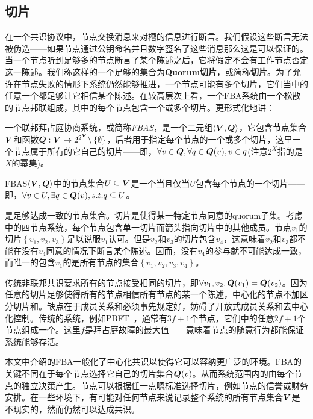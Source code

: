 \subsection{{\quorum}切片}

在一个共识协议中，节点交换消息来对槽的信息进行断言。我们假设这些断言无法被伪造——如果节点通过公钥命名并且数字签名了这些消息那么这是可以保证的。当一个节点听到足够多的节点断言了某个陈述之后，它将假定不会有工作节点否定这一陈述。我们称这样的一个足够的集合为\textbf{Quorum切片}，或简称\textbf{切片}。为了允许在节点失败的情形下系统仍然能够推进，一个节点可能有多个切片，它们当中的任意一个都足够让它相信某个陈述。在较高层次上看，一个FBA系统由一个松散的节点邦联组成，其中的每个节点包含一个或多个切片。更形式化地讲：

\begin{definition}[FBAS]
	一个联邦拜占庭协商系统，或简称\textit{FBAS}，是一个二元组$\langle{\bm V}, {\bm Q}\rangle$，它包含节点集合${\bm V}$和{\quorum}函数${\bm Q}:{\bm V}\rightarrow2^{2^{{\bm V}}}\backslash\left\{\emptyset\right\}$，后者用于指定每个节点的一个或多个切片，这里一个节点属于所有的它自己的切片——即，$\forall v\in{\bm Q},\forall q\in{{\bm Q}(v)},v\in q$(注意$2^X$指的是$X$的幂集)。
\end{definition}

\begin{definition}[\quorum]
	FBAS$\langle{\bm V},{\bm Q}\rangle$中的节点集合$U\subseteq{\bm V}$是一个\textit{\quorum}当且仅当$U$包含每个节点的一个切片——即，$\forall v\in U, \exists q \in {\bm Q}(v), s.t. q\subseteq U$。
\end{definition}

{\quorum}是足够达成一致的节点集合。切片是使得某一特定节点同意的quorum子集。考虑中的四节点系统，每个节点包含单一切片而箭头指向切片中的其他成员。节点$v_1$的切片$\left\{v_1,v_2,v_3\right\}$足以说服$v_1$认可。但是$v_2$和$v_3$的切片包含$v_4$，这意味着$v_2$和$v_3$都不能在没有$v_4$同意的情况下断言某个陈述。因而，没有$v_4$的参与就不可能达成一致，而唯一的包含$v_1$的{\quorum}是所有节点的集合$\left\{v_1,v_2,v_3,v_4\right\}$。

传统非联邦共识要求所有的节点接受相同的切片，即$\forall v_1, v_2, {\bm Q}(v_1)={\bm Q}(v_2)$。因为任意的切片足够使得所有的节点相信所有节点的某一个陈述，中心化的节点不加区分切片和{\quorum}。缺点在于成员关系和{\quorum}必须事先规定好，妨碍了开放式成员关系和去中心化控制。传统的系统，例如PBFT~\cite{Castro:1999:PBFT}，通常有$3f+1$个节点，它们中的任意$2f+1$个节点组成一个{\quorum}。这里$f$是拜占庭故障的最大值——意味着节点的随意行为都能保证系统能够存活。

本文中介绍的FBA一般化了中心化共识以使得它可以容纳更广泛的环境。FBA的关键不同在于每个节点选择它自己的{\quorum}切片集合${\bm Q}(v)$。从而系统范围内的{\quorum}由每个节点的独立决策产生。节点可以根据任一点嗯标准选择切片，例如节点的信誉或财务安排。在一些环境下，有可能对任何节点来说记录整个系统的所有节点集合${{\bm V}}$是不现实的，然而仍然可以达成共识。